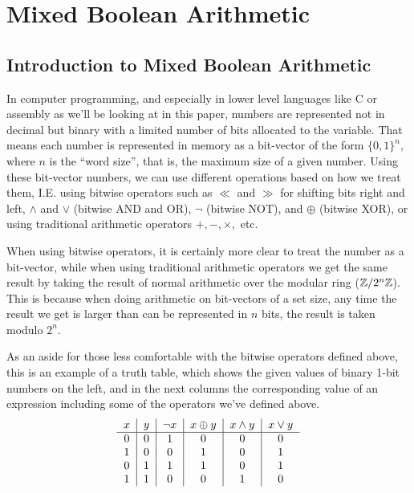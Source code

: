 \section{Mixed Boolean Arithmetic}
\subsection{Introduction to Mixed Boolean Arithmetic}
In computer programming, and especially in lower level languages like C or 
assembly as we'll be looking at in this paper, numbers are represented
not in decimal but binary with a limited number of bits allocated to the 
variable. That means each number is represented in memory as a bit-vector of
the form $\{0,1\}^n$, where $n$ is the ``word size'', that is, the maximum 
size of a given number. Using these bit-vector numbers, we can use different
operations based on how we treat them, I.E. using bitwise operators such as
$\ll$ and $\gg$ for shifting bits right and left, $\land$ and $\lor$ (bitwise AND and OR), $\neg$ (bitwise NOT), 
and $\oplus$ (bitwise XOR), or using traditional arithmetic operators $+, -, \times,$ etc.
\par When using bitwise operators, it is certainly more clear to treat the 
number as a bit-vector, while when using traditional arithmetic operators
we get the same result by taking the result of normal arithmetic over the modular ring 
($\mathbb{Z}/2^n\mathbb{Z}$). This is because when doing arithmetic on bit-vectors of a set size, 
any time the result we get is larger than can be represented in $n$ bits, the result
is taken modulo $2^n$.
\par As an aside for those less comfortable with the bitwise operators defined above, 
this is an example of a truth table, which shows the given values of binary 1-bit
numbers on the left, and in the next columns the corresponding value of an 
expression including some of the operators we've defined above.
\begin{align*}
    \begin{tabular}{c|c|c|c|c|c}
        $x$ & $y$ & $\neg x$ & $x \oplus y$ & $x \land y$ & $x \lor y$\\
        \hline
        0 & 0 & 1 & 0 & 0 & 0\\
        1 & 0 & 0 & 1 & 0 & 1\\
        0 & 1 & 1 & 1 & 0 & 1\\
        1 & 1 & 0 & 0 & 1 & 0\\
    \end{tabular}
\end{align*}
